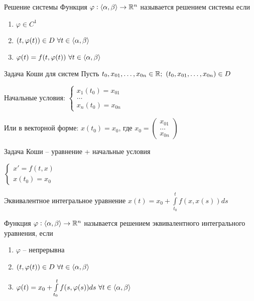 \documentclass[12pt]{article}
\begin{document}
\begin{defin}{Решение системы}
    Функция $\varphi : \langle \alpha, \beta \rangle \to \mathbb R^n$ называется решением системы если 

    \begin{enumerate}
        \item $\varphi \in C^1$
        \item $(t, \varphi(t)) \in D\ \forall t \in \langle \alpha, \beta \rangle$
        \item $\varphi(t) = f(t, \varphi(t))\ \forall t \in \langle \alpha, \beta \rangle$
    \end{enumerate}
\end{defin}

\begin{defin}{Задача Коши для систем}
    Пусть $t_0, x_{01}, \ldots, x_{0n} \in \mathbb R;\ (t_0, x_{01}, \ldots, x_{0n}) \in D$

    Начальные условия: $\begin{cases}
        x_1(t_0) = x_{01} \\
        \ldots \\
        x_n(t_0) = x_{0n}
    \end{cases}$

    Или в векторной форме: $x(t_0) = x_0$, где $x_0 = \begin{pmatrix}
        x_{01} \\
        \ldots \\
        x_{0n}
    \end{pmatrix}$

    Задача Коши -- уравнение + начальные условия

    $\begin{cases}
        x' = f(t, x) \\
        x(t_0) = x_0
    \end{cases}$
\end{defin}

\begin{defin}{Эквивалентное интегральное уравнение}
    $x(t) = x_0 + \int\limits_{t_0}^t f(x, x(s))ds$

    Функция $\varphi : \langle \alpha, \beta \rangle \to \mathbb R^n$ называется решением эквивалентного интегрального уравнения, если

    \begin{enumerate}
        \item $\varphi$ -- непрерывна
        \item $(t, \varphi(t)) \in D\ \forall t \in \langle \alpha, \beta \rangle$
        \item $\varphi(t) = x_0 + \int\limits_{t_0}^t f(s, \varphi(s))ds\ \forall t \in \langle \alpha, \beta \rangle$
    \end{enumerate}
\end{defin}
\end{document}
